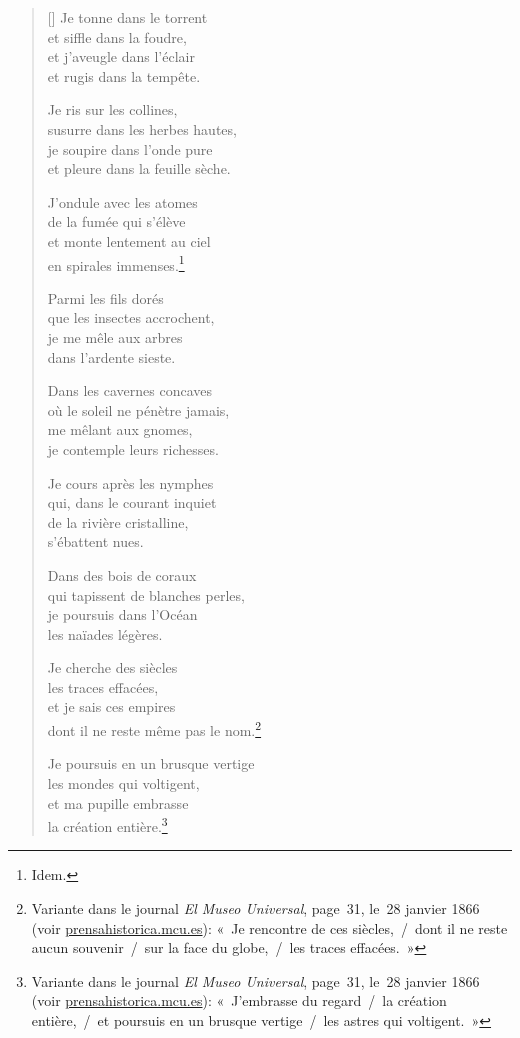 \documentclass[a4paper,12pt]{book}
\begin{document}
\begin{verse}[\versewidth]
  Je tonne dans le torrent \\
  et siffle dans la foudre, \\
  et j'aveugle dans l'éclair \\
  et rugis dans la tempête.

  Je ris sur les collines, \\
  susurre dans les herbes hautes, \\
  je soupire dans l'onde pure \\
  et pleure dans la feuille sèche.

  J'ondule avec les atomes \\
  de la fumée qui s'élève \\
  et monte lentement au ciel \\
  en spirales immenses.\footnote{Idem.}

  Parmi les fils dorés \\
  que les insectes accrochent, \\
  je me mêle aux arbres \\
  dans l'ardente sieste.

  Dans les cavernes concaves \\
  où le soleil ne pénètre jamais, \\
  me mêlant aux gnomes, \\
  je contemple leurs richesses.

  Je cours après les nymphes \\
  qui, dans le courant inquiet \\
  de la rivière cristalline, \\
  s'ébattent nues.

  Dans des bois de coraux \\
  qui tapissent de blanches perles, \\
  je poursuis dans l'Océan \\
  les naïades légères.

  Je cherche des siècles \\
  les traces effacées, \\
  et je sais ces empires \\
  dont il ne reste même pas le nom.\footnote{Variante dans le journal
  \emph{El Museo Universal}, page~31, le~28 janvier 1866 (voir
  \url{prensahistorica.mcu.es}): «~Je rencontre de ces siècles,~/~dont il
  ne reste aucun souvenir~/~sur la face du globe,~/~les traces effacées.~»}

  Je poursuis en un brusque vertige \\
  les mondes qui voltigent, \\
  et ma pupille embrasse \\
  la création entière.\footnote{Variante dans le journal
  \emph{El Museo Universal}, page~31, le~28 janvier 1866 (voir
  \url{prensahistorica.mcu.es}): «~J'embrasse du regard~/~la création
  entière,~/~et poursuis en un brusque vertige~/~les astres qui voltigent.~»}


\end{verse}
\end{document}
